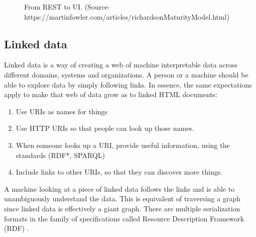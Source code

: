 \begin{figure}[!htb]
  \caption{From REST to UI. (Source: https://martinfowler.com/articles/richardsonMaturityModel.html)}
\end{figure}

\subsection{Linked data}\label{linkeddata}

Linked data is a way of creating a web of machine interpretable data across different domains, systems and organizations. A person or a machine should be able to explore data by simply following links. In essence, the same expectations apply to make that web of data grow as to linked HTML documents: \citep{linkedatafourrules}

\begin{enumerate}
  \item Use URIs as names for things
  \item Use HTTP URIs so that people can look up those names.
  \item When someone looks up a URI, provide useful information, using the standards (RDF*, SPARQL)
  \item Include links to other URIs, so that they can discover more things.
\end{enumerate}

A machine looking at a piece of linked data follows the links and is able to unambiguously understand the data. This is equivalent of traversing a graph since linked data is effectively a giant graph. There are multiple serialization formats in the family of specifications called Resource Description Framework (RDF) \citep{rdfspecification}.

